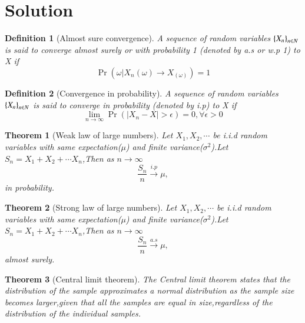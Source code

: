 \documentclass[journal,12pt,twocolumn]{IEEEtran}
\newtheorem{definition}{Definition}[section]
\newtheorem{theorem}{Theorem}[section]
\begin{document}
\section{Solution}
\begin{definition}[Almost sure convergence]
A sequence of random variables $\left\{X_n\right\}_{n\in N}$ is said to converge almost surely or with probability 1 (denoted by a.s or w.p 1) to X if
\begin{equation}
    \Pr(\omega |X_n(\omega) \to X_(\omega))=1
\end{equation}

\end{definition}
\begin{definition}[Convergence in probability]
A sequence of random variables $\left\{X_n\right\}_{n\in N}$ is said to converge in probability (denoted by i.p) to X if
\begin{equation}
    \lim_{n \to \infty} \Pr(\left| X_{n}-X\right|>\epsilon)=0 ,\forall \epsilon>0
\end{equation}
\end{definition}
\begin{theorem}[Weak law of large numbers]
\label{theorem}
Let $X_1,X_2,\cdots $ be i.i.d random variables with same expectation($\mu$) and finite variance($\sigma^2$).Let $S_{n}=X_1+X_2+\cdots X_n$,Then as $n \to \infty$
\begin{equation}
    \frac{S_n}{n} \xrightarrow{i.p}  \mu,
\end{equation}
in probability.
\end{theorem}
\begin{theorem}[Strong law of large numbers]
\label{theorem2}
Let $X_1,X_2,\cdots $ be i.i.d random variables with same expectation($\mu$) and finite variance($\sigma^2$).Let $S_{n}=X_1+X_2+\cdots X_n$,Then as $n \to \infty$
\begin{equation}
    \frac{S_n}{n} \xrightarrow{a.s}  \mu,
\end{equation}
almost surely.
\end{theorem}
\begin{theorem}[Central limit theorem]
\label{theorem3}
The Central limit theorem states that the distribution of the sample approximates a normal distribution as the sample size becomes larger,given that all the samples are equal in size,regardless of the distribution of the individual samples.
\end{theorem}
\end{document}
